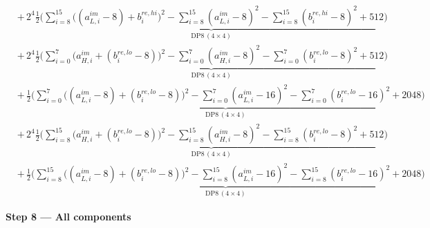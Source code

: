 \documentclass[fleqn]{article}
\newcommand{\DPop}[3]{\mathrm{DP#1}\,(#2\!\times\!#3)}
\begin{document}
\begin{align*}
  & +\, 2^{4}\underbrace{\tfrac12\Big(\sum_{i=8}^{15}\big((a_{L,i}^{im}{-}8){+}b_i^{re,hi}\big)^2 - \sum_{i=8}^{15}(a_{L,i}^{im}{-}8)^2 - \sum_{i=8}^{15}(b_i^{re,hi}{-}8)^2 + 512\Big)}_{\DPop{8}{4}{4}} \\[0.6em]
  & +\, 2^{4}\underbrace{\tfrac12\Big(\sum_{i=0}^{7}\big(a_{H,i}^{im}{+}(b_i^{re,lo}{-}8)\big)^2 - \sum_{i=0}^{7}(a_{H,i}^{im}{-}8)^2 - \sum_{i=0}^{7}(b_i^{re,lo}{-}8)^2 + 512\Big)}_{\DPop{8}{4}{4}} \\[0.6em]
  & +\, \underbrace{\tfrac12\Big(\sum_{i=0}^{7}\big((a_{L,i}^{im}{-}8){+}(b_i^{re,lo}{-}8)\big)^2 - \sum_{i=0}^{7}(a_{L,i}^{im}{-}16)^2 - \sum_{i=0}^{7}(b_i^{re,lo}{-}16)^2 + 2048\Big)}_{\DPop{8}{4}{4}} \\[0.6em]
  & +\, 2^{4}\underbrace{\tfrac12\Big(\sum_{i=8}^{15}\big(a_{H,i}^{im}{+}(b_i^{re,lo}{-}8)\big)^2 - \sum_{i=8}^{15}(a_{H,i}^{im}{-}8)^2 - \sum_{i=8}^{15}(b_i^{re,lo}{-}8)^2 + 512\Big)}_{\DPop{8}{4}{4}} \\[0.6em]
  & +\, \underbrace{\tfrac12\Big(\sum_{i=8}^{15}\big((a_{L,i}^{im}{-}8){+}(b_i^{re,lo}{-}8)\big)^2 - \sum_{i=8}^{15}(a_{L,i}^{im}{-}16)^2 - \sum_{i=8}^{15}(b_i^{re,lo}{-}16)^2 + 2048\Big)}_{\DPop{8}{4}{4}}
\end{align*}

\textbf{Step 8 --- All components}
\end{document}
